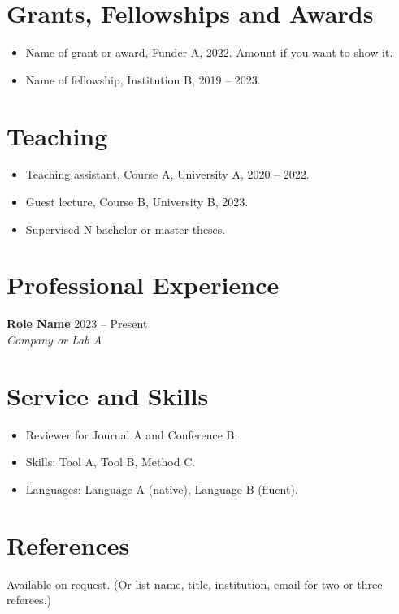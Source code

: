 \documentclass[11pt,a4paper]{article}
\newcommand{\entry}[3]{\textbf{#1} \hfill #3\\ \textit{#2}\par\smallskip}
\begin{document}
\section{Grants, Fellowships and Awards}
\begin{itemize}
  \item Name of grant or award, Funder A, 2022. Amount if you want to show it.
  \item Name of fellowship, Institution B, 2019 -- 2023.
\end{itemize}

\section{Teaching}
\begin{itemize}
  \item Teaching assistant, Course A, University A, 2020 -- 2022.
  \item Guest lecture, Course B, University B, 2023.
  \item Supervised N bachelor or master theses.
\end{itemize}

\section{Professional Experience}
\entry{Role Name}{Company or Lab A}{2023 -- Present}

\section{Service and Skills}
\begin{itemize}
  \item Reviewer for Journal A and Conference B.
  \item Skills: Tool A, Tool B, Method C.
  \item Languages: Language A (native), Language B (fluent).
\end{itemize}

\section{References}
Available on request. (Or list name, title, institution, email for two or three referees.)
\end{document}
